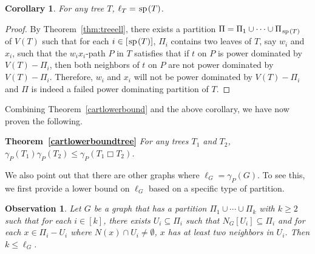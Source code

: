 \documentclass[11pt]{article}
\newtheorem{corollary}{Corollary}
\newtheorem{observation}{Observation}
\newcommand{\spider}{\hskip1pt \textrm{sp} \hskip1pt}
\begin{document}
\begin{corollary} For any tree $T$, $\ell_T = \spider(T)$. 
\end{corollary}
\begin{proof} By Theorem~\ref{thm:treeell}, there exists a partition $\Pi = \Pi_1 \cup \cdots \cup \Pi_{\spider(T)}$ of $V(T)$ such that for each $i \in [\spider(T)]$, $\Pi_i$ contains two leaves of $T$, say $w_i$ and $x_i$, such that the $w_ix_i$-path $P$ in $T$ satisfies that if $t$ on $P$ is power dominated by $V(T) - \Pi_i$, then both neighbors of $t$ on $P$ are not power dominated by $V(T) - \Pi_i$. Therefore, $w_i$ and $x_i$ will not be power dominated by $V(T) - \Pi_i$ and $\Pi$ is indeed a failed power dominating partition of $T$. 
\end{proof}

Combining Theorem~\ref{cartlowerbound} and the above corollary, we have now proven the following.  

\medskip
\noindent \textbf{Theorem~\ref{cartlowerboundtree}} \emph{For any trees $T_1$ and $T_2$, $\gamma_P(T_1)\gamma_P(T_2) \leq \gamma_P(T_1 \Box T_2)$.} 
\medskip

We also point out that there are other graphs where $\ell_G= \gamma_P(G)$. To see this, we first provide a lower bound on $\ell_G$ based on a specific type of partition.

\begin{observation}\label{obs:sp} Let $G$ be a graph that has a partition $\Pi_1 \cup \cdots \cup \Pi_{k}$ with $k\ge2$ such that for each $i \in[k]$, there exists $U_i \subseteq \Pi_i$ such that $N_G[U_i] \subseteq \Pi_i$ and for each $x \in \Pi_i-U_i$ where $N(x) \cap U_i \ne \emptyset$, $x$ has at least two neighbors in $U_i$. Then $k \le \ell_G$. 
\end{observation}

\end{document}
